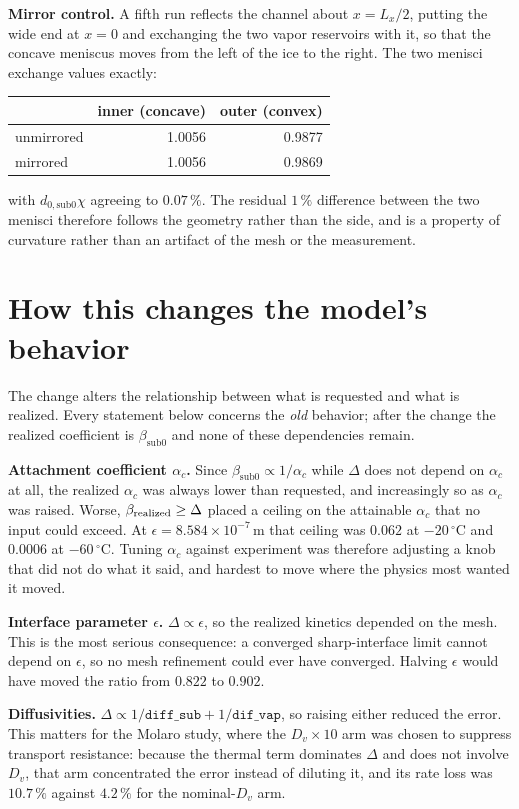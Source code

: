 \documentclass[11pt,a4paper]{article}
\newcommand{\bsub}{\beta_{\mathrm{sub0}}}
\newcommand{\dsub}{d_{0,\mathrm{sub0}}}
\begin{document}
\textbf{Mirror control.} A fifth run reflects the channel about $x=L_x/2$, putting the
wide end at $x=0$ and exchanging the two vapor reservoirs with it, so that the concave
meniscus moves from the left of the ice to the right. The two menisci exchange values
exactly:
\begin{center}\small\begin{tabular}{lrr}\toprule
 & inner (concave) & outer (convex)\\ \midrule
unmirrored & 1.0056 & 0.9877\\
mirrored   & 1.0056 & 0.9869\\ \bottomrule
\end{tabular}\end{center}
with $\dsub\chi$ agreeing to $0.07\,\%$. The residual $1\,\%$ difference between the two
menisci therefore follows the geometry rather than the side, and is a property of
curvature rather than an artifact of the mesh or the measurement.

\section{How this changes the model's behavior}\label{sec:effects}

The change alters the relationship between what is requested and what is realized. Every
statement below concerns the \emph{old} behavior; after the change the realized
coefficient is $\bsub$ and none of these dependencies remain.

\textbf{Attachment coefficient $\alpha_c$.} Since $\bsub\propto1/\alpha_c$ while $\Delta$
does not depend on $\alpha_c$ at all, the realized $\alpha_c$ was always lower than
requested, and increasingly so as $\alpha_c$ was raised. Worse, $\beta_{\rm realized}\ge\Delta$
placed a ceiling on the attainable $\alpha_c$ that no input could exceed. At
$\epsilon=8.584\times10^{-7}$\,m that ceiling was $0.062$ at $-20\,^\circ$C and $0.0006$
at $-60\,^\circ$C. Tuning $\alpha_c$ against experiment was therefore adjusting a knob
that did not do what it said, and hardest to move where the physics most wanted it moved.

\textbf{Interface parameter $\epsilon$.} $\Delta\propto\epsilon$, so the realized kinetics
depended on the mesh. This is the most serious consequence: a converged sharp-interface
limit cannot depend on $\epsilon$, so no mesh refinement could ever have converged.
Halving $\epsilon$ would have moved the ratio from $0.822$ to $0.902$.

\textbf{Diffusivities.} $\Delta\propto1/\texttt{diff\_sub}+1/\texttt{dif\_vap}$, so
raising either reduced the error. This matters for the Molaro study, where the
$D_v\times10$ arm was chosen to suppress transport resistance: because the thermal term
dominates $\Delta$ and does not involve $D_v$, that arm concentrated the error instead of
diluting it, and its rate loss was $10.7\,\%$ against $4.2\,\%$ for the nominal-$D_v$ arm.
\end{document}
